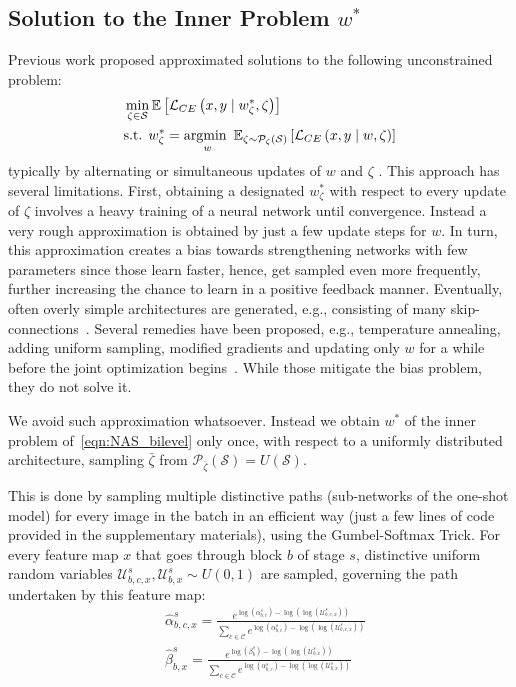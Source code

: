 \documentclass[dvipsnames,table,xcdraw]{article}
\newcommand{\argmin}{\operatornamewithlimits{argmin~}}
\begin{document}
\subsection{Solution to the Inner Problem $w^*$}
\label{sec:inner_problem}
Previous work proposed approximated solutions to the following unconstrained problem:
\begin{align*}
&\min_{\zeta \in \mathcal{S}} \mathbb{E}\left[\mathcal{L}_{CE}\left(x, y \mid w^*_\zeta, \zeta\right)\right] \notag\\
&\text{s.t. }
w^*_\zeta=\argmin_{w} \mathbb{E}_{\zeta\sim\mathcal{P}_\zeta(\mathcal{S})}\left[\mathcal{L}_{CE}\left(x, y \mid w, \zeta\right)\right] \notag
\end{align*}
typically by alternating or simultaneous updates of $w$ and $\zeta$ \cite{liu2018darts, SNAS, cai2018proxylessnas, fbnet, TF-NAS}.
This approach has several limitations.
First, obtaining a designated $w^*_\zeta$ with respect to every update of $\zeta$ involves a heavy training of a neural network until convergence. Instead a very rough approximation is obtained by just a few update steps for $w$.
In turn, this approximation creates a bias towards strengthening networks with few parameters since those learn faster, hence, get sampled even more frequently, further increasing the chance to learn in a positive feedback manner. Eventually, often overly simple architectures are generated, e.g., consisting of many skip-connections~\cite{P-DARTS, DARTS+}. Several remedies have been proposed, e.g., temperature annealing, adding uniform sampling, modified gradients and updating only $w$ for a while before the joint optimization begins~\cite{noy2020asap, fbnet, TF-NAS, nayman2019xnas}. While those mitigate the bias problem, they do not solve it.

We avoid such approximation whatsoever. Instead we obtain $w^*$ of the inner problem of~\eqref{eqn:NAS_bilevel} only once, with respect to a uniformly distributed architecture, sampling $\bar{\zeta}$ from $\mathcal{P}_{\bar{\zeta}}(\mathcal{S})=U(\mathcal{S})$.

This is done by sampling multiple distinctive paths (sub-networks of the one-shot model) for every image in the batch in an efficient way (just a few lines of code provided in the supplementary materials), using the Gumbel-Softmax Trick. 
For every feature map $x$ that goes through block $b$ of stage $s$, distinctive uniform random variables $\mathcal{U}^s_{b,c,x}, \mathcal{U}^s_{b,x}\!\sim\!U(0,1)$ are sampled, governing the path undertaken by this feature map:
\begin{align}
\label{eqn:gumbel_alpha}
    &\hat{\alpha}^s_{b,c,x} = \frac{e^{\log(\alpha^s_{b,c}) -\log(\log(\mathcal{U}^s_{b,c,x}))}}{\sum_{c\in \mathcal{C}} e^{\log(\alpha^s_{b,c}) -\log(\log(\mathcal{U}^s_{b,c,x}))}}
    \\
    \label{eqn:gumbel_beta}
    &\hat{\beta}^s_{b,x} = \frac{e^{\log(\beta^s_b) -\log(\log(\mathcal{U}^s_{b,x}))}}{\sum_{c\in \mathcal{C}} e^{\log(\alpha^s_{b,c}) -\log(\log(\mathcal{U}^s_{b,x}))}}
\end{align}
\end{document}
